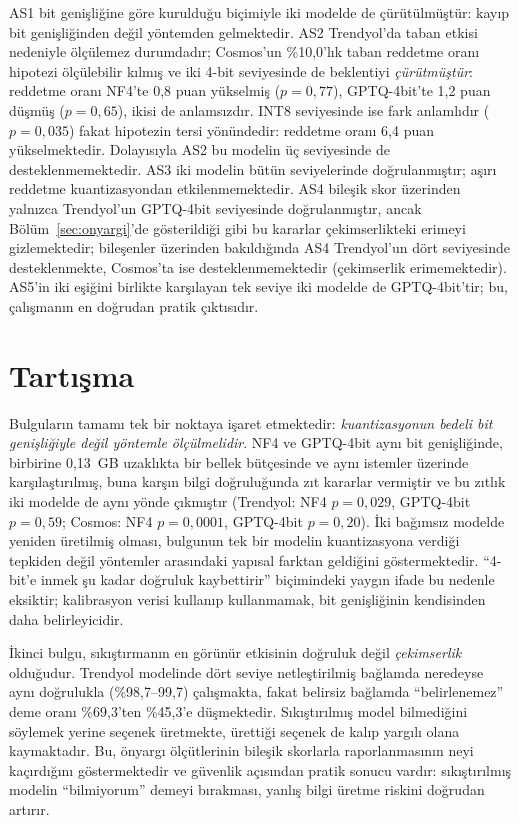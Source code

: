 \documentclass[conference]{IEEEtran}
\begin{document}
AS1 bit genişliğine göre kurulduğu biçimiyle iki modelde de çürütülmüştür:
kayıp bit genişliğinden değil yöntemden gelmektedir. AS2 Trendyol'da taban
etkisi nedeniyle ölçülemez durumdadır; Cosmos'un \%10,0'lık taban reddetme
oranı hipotezi ölçülebilir kılmış ve iki 4-bit seviyesinde de beklentiyi
\emph{çürütmüştür}: reddetme oranı NF4'te 0,8 puan yükselmiş ($p=0{,}77$),
GPTQ-4bit'te 1,2 puan düşmüş ($p=0{,}65$), ikisi de anlamsızdır. INT8 seviyesinde ise fark anlamlıdır ($p=0{,}035$) fakat hipotezin tersi
yönündedir: reddetme oranı 6,4 puan yükselmektedir. Dolayısıyla AS2 bu modelin
üç seviyesinde de desteklenmemektedir. AS3 iki modelin bütün seviyelerinde
doğrulanmıştır; aşırı reddetme kuantizasyondan etkilenmemektedir. AS4 bileşik
skor üzerinden yalnızca Trendyol'un GPTQ-4bit seviyesinde doğrulanmıştır,
ancak Bölüm~\ref{sec:onyargi}'de gösterildiği gibi bu kararlar
çekimserlikteki erimeyi gizlemektedir; bileşenler üzerinden bakıldığında AS4
Trendyol'un dört seviyesinde desteklenmekte, Cosmos'ta ise desteklenmemektedir
(çekimserlik erimemektedir). AS5'in iki eşiğini birlikte karşılayan tek seviye
iki modelde de GPTQ-4bit'tir; bu, çalışmanın en doğrudan pratik çıktısıdır.

\section{Tartışma}

Bulguların tamamı tek bir noktaya işaret etmektedir: \emph{kuantizasyonun
bedeli bit genişliğiyle değil yöntemle ölçülmelidir}. NF4 ve GPTQ-4bit aynı
bit genişliğinde, birbirine 0,13~GB uzaklıkta bir bellek bütçesinde ve aynı
istemler üzerinde karşılaştırılmış, buna karşın bilgi doğruluğunda zıt
kararlar vermiştir ve bu zıtlık iki modelde de aynı yönde çıkmıştır
(Trendyol: NF4 $p=0{,}029$, GPTQ-4bit $p=0{,}59$; Cosmos: NF4 $p=0{,}0001$,
GPTQ-4bit $p=0{,}20$). İki bağımsız modelde yeniden üretilmiş olması, bulgunun
tek bir modelin kuantizasyona verdiği tepkiden değil yöntemler arasındaki
yapısal farktan geldiğini göstermektedir. ``4-bit'e inmek şu kadar doğruluk
kaybettirir'' biçimindeki yaygın ifade bu nedenle eksiktir; kalibrasyon verisi
kullanıp kullanmamak, bit genişliğinin kendisinden daha belirleyicidir.

İkinci bulgu, sıkıştırmanın en görünür etkisinin doğruluk değil
\emph{çekimserlik} olduğudur. Trendyol modelinde dört seviye netleştirilmiş
bağlamda neredeyse aynı doğrulukla (\%98,7--99,7) çalışmakta, fakat belirsiz
bağlamda ``belirlenemez'' deme oranı \%69,3'ten \%45,3'e düşmektedir.
Sıkıştırılmış model bilmediğini söylemek yerine seçenek üretmekte, ürettiği
seçenek de kalıp yargılı olana kaymaktadır. Bu, önyargı ölçütlerinin bileşik
skorlarla raporlanmasının neyi kaçırdığını göstermektedir ve güvenlik
açısından pratik sonucu vardır: sıkıştırılmış modelin ``bilmiyorum'' demeyi
bırakması, yanlış bilgi üretme riskini doğrudan artırır.
\end{document}
